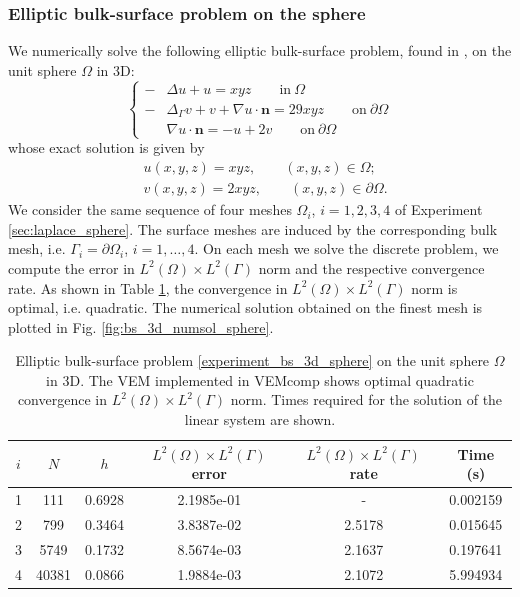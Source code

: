 \documentclass[a4paper]{article}
\newcommand{\boldn}{\boldsymbol{n}}
\begin{document}
\subsubsection{Elliptic bulk-surface problem on the sphere}
\label{sec:example_elliptic_bs_sphere}
We numerically solve the following elliptic bulk-surface problem,  found in \cite{elliott2013finite}, on the unit sphere $\Omega$ in 3D:
\begin{equation}
\label{experiment_bs_3d_sphere}
\begin{cases}
-&\Delta u + u = xyz \qquad \text{in}\ \Omega\\
-&\Delta_\Gamma v + v +\nabla u\cdot\boldn = 29xyz \qquad \text{on}\ \partial \Omega\\
&\nabla u \cdot \boldn = -u + 2v   \qquad \text{on}\ \partial \Omega
\end{cases}
\end{equation}
whose exact solution is given by
\begin{align*}
&u(x,y,z) = xyz, \qquad (x,y,z) \in \Omega;\\
&v(x,y,z) = 2xyz, \qquad (x,y,z) \in \partial\Omega.
\end{align*}
We consider the same sequence of four meshes $\Omega_i$, $i=1,2,3,4$ of Experiment \ref{sec:laplace_sphere}.  The surface meshes are induced by the corresponding bulk mesh, i.e. $\Gamma_i = \partial \Omega_i$, $i=1,\dots,4$. On each mesh we solve the discrete problem,  we compute the error in $L^2(\Omega)\times L^2(\Gamma)$ norm and the respective convergence rate. As shown in Table \ref{tab:bs_3d_convergence_sphere}, the convergence in $L^2(\Omega)\times L^2(\Gamma)$ norm is optimal, i.e. quadratic. The numerical solution obtained on the finest mesh is plotted in Fig.  \ref{fig:bs_3d_numsol_sphere}.

\begin{table}[H]
\caption{Elliptic bulk-surface problem \eqref{experiment_bs_3d_sphere} on the unit sphere $\Omega$ in 3D. The VEM implemented in VEMcomp shows optimal quadratic convergence in $L^2(\Omega) \times L^2(\Gamma)$ norm. Times required for the solution of the linear system are shown.}
\begin{center}
\begin{tabular}{c | c | c | c | c | c}
$i$ & $N$ & $h$ & $L^2(\Omega)\times L^2(\Gamma)$ error & $L^2(\Omega)\times L^2(\Gamma)$ rate & Time (s)\\
\hline
1 & 111 & 0.6928 &   2.1985e-01 &  -   & 0.002159\\
2 & 799 & 0.3464 & 3.8387e-02 & 2.5178    & 0.015645\\
3 & 5749 & 0.1732 & 8.5674e-03 & 2.1637  & 0.197641  \\
4 & 40381 & 0.0866 &  1.9884e-03 & 2.1072 & 5.994934
\end{tabular}
\end{center}
\label{tab:bs_3d_convergence_sphere}
\end{table}
\end{document}
